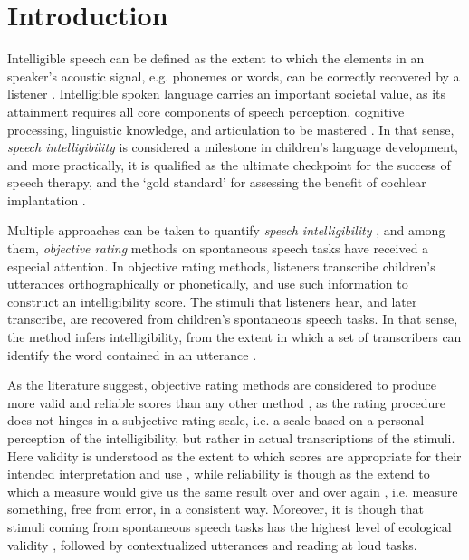 \section{Introduction} \label{S:introduction}

Intelligible speech can be defined as the extent to which the elements in an speaker's acoustic signal, e.g. phonemes or words, can be correctly recovered by a listener \citep{Kent_et_al_1989, Whitehill_et_al_2004, vanHeuven_2008, Freeman_et_al_2017}. Intelligible spoken language carries an important societal value, as its attainment requires all core components of speech perception, cognitive processing, linguistic knowledge, and articulation to be mastered \citep{Freeman_et_al_2017}. In that sense, \textit{speech intelligibility} is considered a milestone in children's language development, and more practically, it is qualified as the ultimate checkpoint for the success of speech therapy, and the `gold standard' for assessing the benefit of cochlear implantation \citep{Chin_et_al_2012}. 

Multiple approaches can be taken to quantify \textit{speech intelligibility} \citep{Boonen_et_al_2020, Boonen_et_al_2021, Flipsen_2006, Hustad_et_al_2020}, and among them, \textit{objective rating} methods \citep{Hustad_et_al_2020} on spontaneous speech tasks have received a especial attention. In objective rating methods, listeners transcribe children's utterances orthographically or phonetically, and use such information to construct an intelligibility score. The stimuli that listeners hear, and later transcribe, are recovered from children's spontaneous speech tasks. In that sense, the method infers intelligibility, from the extent in which a set of transcribers can identify the word contained in an utterance \cite{Boonen_et_al_2021}. 

As the literature suggest, objective rating methods are considered to produce more valid and reliable scores than any other method \citep{Boonen_et_al_2021, Faes_et_al_2021}, as the rating procedure does not hinges in a subjective rating scale, i.e. a scale based on a personal perception of the intelligibility, but rather in actual transcriptions of the stimuli. Here validity is understood as the extent to which scores are appropriate for their intended interpretation and use \citep{Lesterhuis_2018, Trochim_2022}, while reliability is though as the extend to which a measure would give us the same result over and over again \citep{Trochim_2022}, i.e. measure something, free from error, in a consistent way. Moreover, it is though that stimuli coming from spontaneous speech tasks has the highest level of ecological validity \cite{Flipsen_2006, Ertmer_2011}, followed by contextualized utterances and reading at loud tasks.

